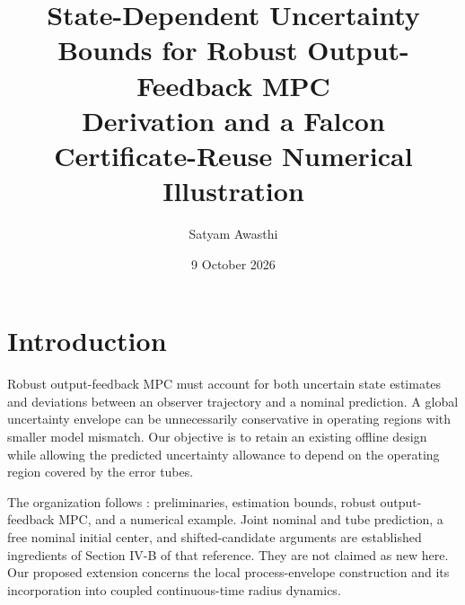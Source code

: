 \documentclass[11pt,a4paper]{article}
\title{State-Dependent Uncertainty Bounds for Robust Output-Feedback MPC\\\large Derivation and a Falcon Certificate-Reuse Numerical Illustration}
\author{Satyam Awasthi}
\date{9 October 2026}
\numberwithin{equation}{section}
\theoremstyle{remark}\newtheorem{remark}{Remark}
\begin{document}
\maketitle

\section{Introduction}
Robust output-feedback MPC must account for both uncertain state estimates and deviations between an observer trajectory and a nominal prediction. A global uncertainty envelope can be unnecessarily conservative in operating regions with smaller model mismatch. Our objective is to retain an existing offline design while allowing the predicted uncertainty allowance to depend on the operating region covered by the error tubes.

The organization follows \cite{kohler2021}: preliminaries, estimation bounds, robust output-feedback MPC, and a numerical example. Joint nominal and tube prediction, a free nominal initial center, and shifted-candidate arguments are established ingredients of Section IV-B of that reference. They are not claimed as new here. Our proposed extension concerns the local process-envelope construction and its incorporation into coupled continuous-time radius dynamics.
\end{document}
